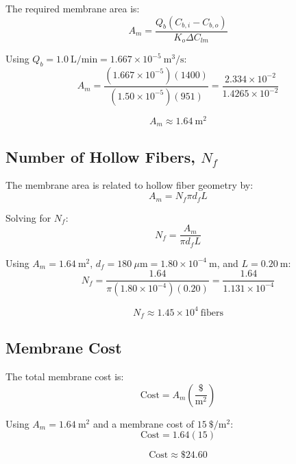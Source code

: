 \documentclass[10.5pt]{article}
\begin{document}
The required membrane area is:
\[
    A_m =
    \frac{Q_b(C_{b,i}-C_{b,o})}
    {K_o \Delta C_{lm}}
\]

Using $Q_b=1.0 \ \text{L/min}=1.667 \times 10^{-5} \ \text{m}^3/\text{s}$:
\[
    A_m
    =
    \frac{(1.667 \times 10^{-5})(1400)}
    {(1.50 \times 10^{-5})(951)}
    =
    \frac{2.334 \times 10^{-2}}
    {1.4265 \times 10^{-2}}
\]

\[
    \boxed{A_m \approx 1.64 \ \text{m}^2}
\]

\subsection{Number of Hollow Fibers, $N_f$}

The membrane area is related to hollow fiber geometry by:
\[
    A_m = N_f \pi d_f L
\]

Solving for $N_f$:
\[
    N_f = \frac{A_m}{\pi d_f L}
\]

Using $A_m=1.64 \ \text{m}^2$, $d_f=180 \ \mu\text{m}=1.80 \times 10^{-4} \ \text{m}$, and $L=0.20 \ \text{m}$:
\[
    N_f
    =
    \frac{1.64}
    {\pi(1.80 \times 10^{-4})(0.20)}
    =
    \frac{1.64}{1.131 \times 10^{-4}}
\]

\[
    \boxed{N_f \approx 1.45 \times 10^4 \ \text{fibers}}
\]

\subsection{Membrane Cost}

The total membrane cost is:
\[
    \text{Cost}
    =
    A_m \left(\frac{\$}{\text{m}^2}\right)
\]

Using $A_m=1.64 \ \text{m}^2$ and a membrane cost of $15 \ \$/\text{m}^2$:
\[
    \text{Cost} = 1.64(15)
\]

\[
    \boxed{\text{Cost} \approx \$24.60}
\]
\end{document}
